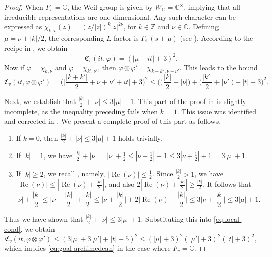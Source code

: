 \documentclass[12pt,reqno]{amsart}
\theoremstyle{remark}
\DeclareMathOperator{\Real}{Re}
\numberwithin{equation}{section}
\begin{document}
\begin{appendices}
\begin{proof}
   When $F_v = \mathbb{C}$, the Weil group is given by $W_{\mathbb{C}} = \mathbb{C}^{\times}$, implying that all irreducible representations are one-dimensional. Any such character can be expressed as $\chi_{k,v}(z) = (z/|z|)^k|z|^{2\nu}$, for $k \in \mathbb{Z}$ and $\nu \in \mathbb{C}$. Defining $\mu = \nu + |k|/2$, the corresponding $L$-factor is $\Gamma_{\mathbb{C}}(s+\mu)$ (see \cite[(4.6)]{Knapp}). According to the recipe in \cite[(21) and (31)]{Iwaniec-Sarnak}, we obtain
   \[
        \mathfrak{C}_v(it, \varphi) = (|\mu+it|+3)^2.
   \]
   Now if $\varphi = \chi_{k,\nu}$ and $\varphi = \chi_{k',\nu'}$, then $\varphi \otimes \varphi' = \chi_{k+k',\nu+\nu'}$. This leads to the bound
   \begin{equation}\label{eq:local-cond}
        \mathfrak{C}_v(it, \varphi \otimes \varphi') = \Big( \Big|\frac{|k+k'|}{2} +\nu+\nu'+it\Big|+3\Big)^2 \le \Big(\Big(\frac{|k|}{2}+|\nu|\Big) + \Big(\frac{|k'|}{2}+|\nu'|\Big)+|t|+3 \Big)^2.
    \end{equation}
   
    Next, we establish that $\frac{|k|}{2} + |\nu| \le 3|\mu|+1$. This part of the proof in \cite[Appendix A.2]{Humphries-Brumley} is slightly incomplete, as the inequality preceding \cite[(A.13)]{Humphries-Brumley} fails when $k=1$. This issue was identified and corrected in \cite[P. 9]{Ramakrishnan-Yang}. We present a complete proof of this part as follows. 
    \begin{enumerate}
        \item If $k=0$, then $\frac{|k|}{2} + |\nu| \le  3|\mu|+1$ holds trivially. 
        \item If $|k|=1$, we have $\frac{|k|}{2} + |\nu| = |\nu|+\frac{1}{2} \le |\nu +\frac{1}{2}|+1 \le 3|\nu +\frac{1}{2}|+1 = 3|\mu|+1$.
        \item If $|k| \ge 2$, we recall \cite[Corollary 2.5]{Jacquet-Shalika}, namely, $|\Real(\nu)| \le \frac{1}{2}$. Since $\frac{|k|}{2} > 1$, we have $|\Real(\nu)| \le |\Real(\nu)+\frac{|k|}{2}|$, and also $2|\Real(\nu)+\frac{|k|}{2}| \ge \frac{|k|}{2}$.  It follows that
        \[
        |\nu| +\frac{|k|}{2} \le \Big|\nu + \frac{|k|}{2}\Big| +\frac{|k|}{2} \le \Big|\nu + \frac{|k|}{2}\Big|+ 2\Big|\Real(\nu)+\frac{|k|}{2}\Big| \le 3\Big|\nu+\frac{|k|}{2}\Big| \le 3|\mu|+1.\]
    \end{enumerate}
    Thus we have shown that $\frac{|k|}{2} + |\nu| \le  3|\mu|+1$. Substituting this into \eqref{eq:local-cond}, we obtain
    \[
        \mathfrak{C}_v(it, \varphi \otimes \varphi') \le (  3|\mu| + 3|\mu'|+|t|+5)^2 \le (|\mu|+3)^2(|\mu'|+3)^2( |t|+3)^2,
   \]
   which implies \eqref{eq:goal-archimedean} in the case where  $F_v = \mathbb{C}$.
   

\end{proof}
\end{appendices}
\end{document}
